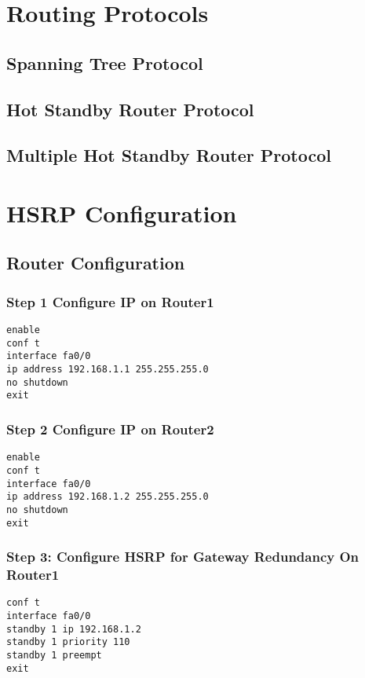 \documentclass[12pt]{report}
\begin{document}
\chapter{Routing Protocols}
\section{Spanning Tree Protocol}
\section{Hot Standby Router Protocol}
\section{Multiple Hot Standby Router Protocol}
\newpage

\chapter{HSRP Configuration}

\section{Router Configuration}
\subsection*{Step 1 Configure IP on Router1}
\begin{Verbatim}[fontsize=\small, formatcom=\hackfont\color{black}, frame=single]
enable
conf t
interface fa0/0
ip address 192.168.1.1 255.255.255.0
no shutdown
exit
\end{Verbatim}

\subsection*{Step 2 Configure IP on Router2}
\begin{Verbatim}[fontsize=\small, formatcom=\hackfont\color{black}, frame=single]
enable
conf t
interface fa0/0
ip address 192.168.1.2 255.255.255.0
no shutdown
exit
\end{Verbatim}

\subsection*{Step 3: Configure HSRP for Gateway Redundancy On Router1}
\begin{Verbatim}[fontsize=\small, formatcom=\hackfont\color{black}, frame=single]
conf t
interface fa0/0
standby 1 ip 192.168.1.2
standby 1 priority 110
standby 1 preempt
exit
\end{Verbatim}
\end{document}
